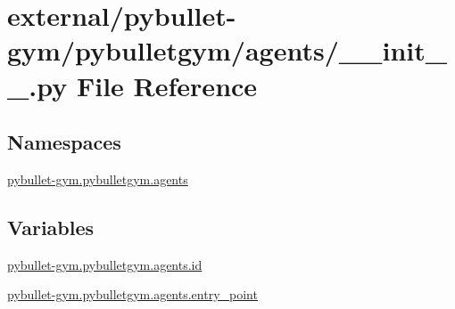 \hypertarget{external_2pybullet-gym_2pybulletgym_2agents_2____init_____8py}{}\section{external/pybullet-\/gym/pybulletgym/agents/\+\_\+\+\_\+init\+\_\+\+\_\+.py File Reference}
\label{external_2pybullet-gym_2pybulletgym_2agents_2____init_____8py}
\subsection*{Namespaces}
\begin{DoxyCompactItemize}
\item 
 \hyperlink{namespacepybullet-gym_1_1pybulletgym_1_1agents}{pybullet-\/gym.\+pybulletgym.\+agents}
\end{DoxyCompactItemize}
\subsection*{Variables}
\begin{DoxyCompactItemize}
\item 
\hyperlink{namespacepybullet-gym_1_1pybulletgym_1_1agents_a0c7585c58d4374c748bb1a19ca9ae5b7}{pybullet-\/gym.\+pybulletgym.\+agents.\+id}
\item 
\hyperlink{namespacepybullet-gym_1_1pybulletgym_1_1agents_a21dc32ada053ca5c8d9fece96bff7091}{pybullet-\/gym.\+pybulletgym.\+agents.\+entry\+\_\+point}
\end{DoxyCompactItemize}
